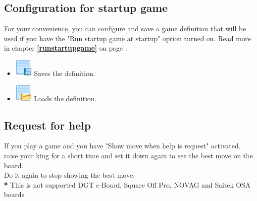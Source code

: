 \documentclass[11pt,a4paper]{article}
\begin{document}
\subsection{Configuration for startup game} \label{startupgame}

For your convenience, you can configure and save a game definition that will be used if you have the "Run startup game at startup" option turned on.  Read more in chapter \textbf{\ref{runstartupgame}  } on page \pageref{runstartupgame}.

\begin{itemize}
	  \item \includegraphics[scale=0.5]{layer_save.png} Saves the definition.
  	  \item \includegraphics[scale=0.5]{layer_open.png} Loads the definition.
\end{itemize}


\subsection{Request for help}
If you play a game and you have "Show move when help is request" activated. raise your king for a short time and set it down again to see the best move on the board.\\
Do it again to stop showing the best move.\\
{\color{red}\textbf{*}} This is not supported DGT e-Board, Square Off Pro, NOVAG and Saitek OSA boards
\end{document}

